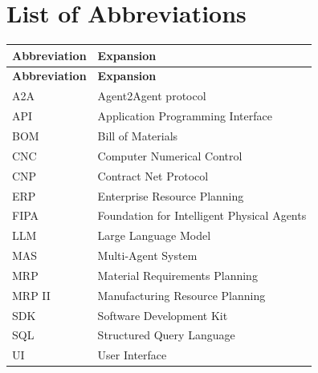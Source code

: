 \chapter*{List of Abbreviations}

\begin{longtable}{@{}p{3cm}p{10cm}@{}}
\toprule
\textbf{Abbreviation} & \textbf{Expansion} \\
\midrule
\endfirsthead
\toprule
\textbf{Abbreviation} & \textbf{Expansion} \\
\midrule
\endhead
A2A    & Agent2Agent protocol \\
API    & Application Programming Interface \\
BOM    & Bill of Materials \\
CNC    & Computer Numerical Control \\
CNP    & Contract Net Protocol \\
ERP    & Enterprise Resource Planning \\
FIPA   & Foundation for Intelligent Physical Agents \\
LLM    & Large Language Model \\
MAS    & Multi-Agent System \\
MRP    & Material Requirements Planning \\
MRP II & Manufacturing Resource Planning \\
SDK    & Software Development Kit \\
SQL    & Structured Query Language \\
UI     & User Interface \\
\bottomrule
\end{longtable}

\clearpage
